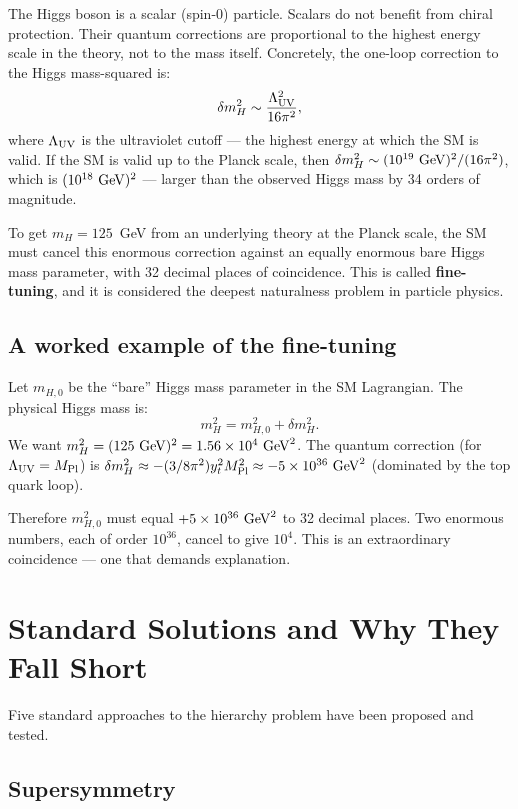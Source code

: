 \documentclass[11pt,a4paper]{article}
\newcommand{\term}[1]{\textbf{#1}}
\begin{document}
The Higgs boson is a scalar (spin-0) particle.
Scalars do not benefit from chiral protection.
Their quantum corrections are proportional to the highest energy scale in
the theory, not to the mass itself.
Concretely, the one-loop correction to the Higgs mass-squared is:
\[
  \delta m_H^2 \sim \frac{\Lambda_{\rm UV}^2}{16\pi^2},
\]
where $\Lambda_{\rm UV}$ is the ultraviolet cutoff --- the highest energy
at which the SM is valid.
If the SM is valid up to the Planck scale, then
$\delta m_H^2 \sim (10^{19}~{\rm GeV})^2 / (16\pi^2)$,
which is $(10^{18}~{\rm GeV})^2$ --- larger than the observed Higgs mass
by 34 orders of magnitude.

To get $m_H = 125$~GeV from an underlying theory at the Planck scale,
the SM must cancel this enormous correction against an equally enormous
bare Higgs mass parameter, with 32 decimal places of coincidence.
This is called \term{fine-tuning}, and it is considered the
deepest naturalness problem in particle physics.

\subsection{A worked example of the fine-tuning}

Let $m_{H,0}$ be the ``bare'' Higgs mass parameter in the SM Lagrangian.
The physical Higgs mass is:
\[
  m_H^2 = m_{H,0}^2 + \delta m_H^2.
\]
We want $m_H^2 = (125~{\rm GeV})^2 = 1.56 \times 10^4~{\rm GeV}^2$.
The quantum correction (for $\Lambda_{\rm UV} = M_{\rm Pl}$) is
$\delta m_H^2 \approx -(3/8\pi^2) y_t^2 M_{\rm Pl}^2 \approx -5 \times 10^{36}~{\rm GeV}^2$
(dominated by the top quark loop).

Therefore $m_{H,0}^2$ must equal $+5 \times 10^{36}~{\rm GeV}^2$ to 32
decimal places.
Two enormous numbers, each of order $10^{36}$, cancel to give $10^4$.
This is an extraordinary coincidence --- one that demands explanation.

\section{Standard Solutions and Why They Fall Short}
\label{sec:standard}

Five standard approaches to the hierarchy problem have been proposed
and tested.

\subsection{Supersymmetry}
\end{document}
